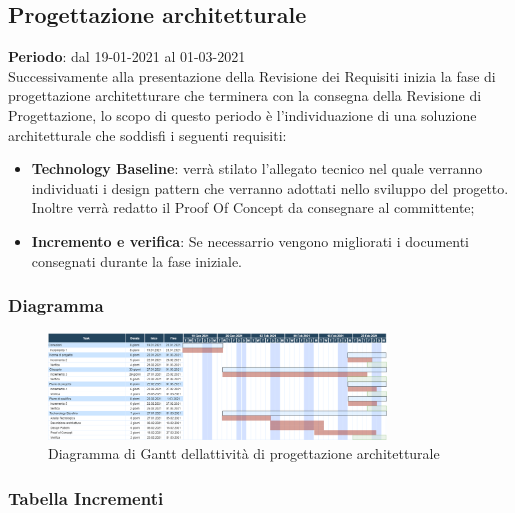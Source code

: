 	\subsection{Progettazione architetturale}
	\textbf{Periodo}: dal 19-01-2021 al 01-03-2021 \\
	Successivamente alla presentazione della Revisione dei Requisiti inizia la fase di progettazione architetturare che terminera con la consegna della Revisione di Progettazione, lo scopo di questo periodo è l'individuazione di una soluzione architetturale che soddisfi i seguenti requisiti:
	\begin{itemize}
		\item \textbf{Technology Baseline}: verrà stilato l'allegato tecnico nel quale verranno individuati i design pattern che verranno adottati nello sviluppo del progetto. Inoltre verrà redatto il Proof Of Concept da consegnare al committente;
		\item \textbf{Incremento e verifica}: Se necessarrio vengono migliorati i documenti consegnati durante la fase iniziale.
	\end{itemize}
	
	\subsubsection{Diagramma}
		\begin{figure}[H]
        		\centering
        		\includegraphics[width=0.8\textwidth]{source/img/Progettazione_architetturale.png}
        		\caption{Diagramma di Gantt dell\textquotesingle attività di progettazione architetturale}
    		\end{figure}
	\subsubsection{Tabella Incrementi}
	
